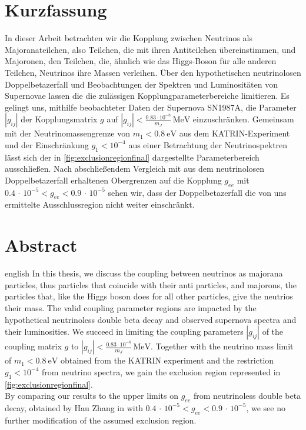\thispagestyle{plain}

\section*{Kurzfassung}
In dieser Arbeit betrachten wir die Kopplung zwischen Neutrinos als Majoranateilchen, also Teilchen, die mit ihren Antiteilchen übereinstimmen, und Majoronen, den Teilchen, die,
ähnlich wie das Higgs-Boson für alle anderen Teilchen, Neutrinos ihre Massen verleihen.
Über den hypothetischen neutrinolosen Doppelbetazerfall und Beobachtungen der Spektren und Luminositäten von Supernovae lassen die die zulässigen Kopplungparameterbereiche limitieren.
Es gelingt uns, mithilfe beobachteter Daten der Supernova SN1987A, die Parameter $|g_{i j}|$ der Kopplungsmatrix $g$ auf $|g_{i j}| < \frac{\num{0.83} \cdot 10^{-8}}{m_J} \,\si{\mega\eV}$ einzuschränken.
Gemeinsam mit der Neutrinomassengrenze von $m_1 < \SI{0.8}{\eV}$ aus dem KATRIN-Experiment und der Einschränkung $g_1 < 10^{-4}$ aus einer Betrachtung der Neutrinospektren lässt sich der in \autoref{fig:exclusionregionfinal}
dargestellte Parameterbereich ausschließen. 
Nach abschließendem Vergleich mit aus dem neutrinolosen Doppelbetazerfall erhaltenen Obergrenzen auf die Kopplung $g_{ee}$ mit $\num{0.4} \, \cdot \, 10^{-5} < g_{ee} < \num{0.9} \, \cdot \, 10^{-5}$ sehen wir, dass
der Doppelbetazerfall die von uns ermittelte Ausschlussregion nicht weiter einschränkt.

\section*{Abstract}
\begin{foreignlanguage}{english}
In this thesis, we discuss the coupling between neutrinos as majorana particles, thus particles that coincide with their anti particles, and majorons, the particles that, like the Higgs boson does for all other
particles, give the neutrios their mass.
The valid coupling parameter regions are impacted by the hypothetical neutrinoless double beta decay and observed supernova spectra and their luminosities.
We succeed in limiting the coupling parameters $|g_{i j}|$ of the coupling matrix $g$ to $|g_{i j}| < \frac{\num{0.83} \cdot 10^{-8}}{m_J} \,\si{\mega\eV}$.
Together with the neutrino mass limit of $m_1 < \SI{0.8}{\eV}$ obtained from the KATRIN experiment and the restriction $g_1 < 10^{-4}$ from neutrino spectra, we gain the exclusion region represented in
\autoref{fig:exclusionregionfinal}. \\
By comparing our results to the upper limits on $g_{ee}$ from neutrinoless double beta decay, obtained by Hau Zhang in \cite{hauhau} with $\num{0.4} \, \cdot \, 10^{-5} < g_{ee} < \num{0.9} \, \cdot \, 10^{-5}$, we see no further
modification of the assumed exclusion region.
\end{foreignlanguage}
